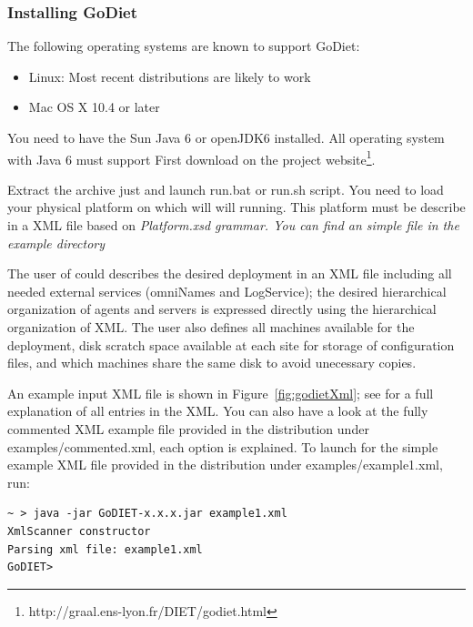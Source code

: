 \subsubsection{Installing GoDiet}

The following operating systems are known to support GoDiet:
\begin{itemize}
    \item Linux: Most recent distributions are likely to work
    \item Mac OS X 10.4 or later
\end{itemize}

You need to have the Sun Java 6 or openJDK6 installed. All operating system with Java 6 must support 
First download \godiet on the project website\footnote{http://graal.ens-lyon.fr/DIET/godiet.html}.

 Extract the archive just and launch run.bat or run.sh script.
You need to load your physical platform on which will \godiet will
running. This platform must be describe in a XML file based on
\it{Platform.xsd} grammar. You can find an simple file in the example directory 



The user of \godiet could describes the desired
deployment in an XML file including all needed external services (\eg omniNames
and LogService); the desired hierarchical organization of agents and servers is
expressed directly using the hierarchical organization of XML. 
The user also defines all machines available for the deployment, disk scratch
space available at each site for storage of configuration files, and which
machines share the same disk to avoid unecessary copies. 


An example input XML file is shown in Figure~\ref{fig:godietXml}; see
\cite{CDa05} for a full explanation of all entries in the XML. You can also
have a look at the fully commented XML example file provided in the \godiet
distribution under examples/commented.xml, each option is explained. To launch
\godiet for the simple example XML file provided in the \godiet distribution
under examples/example1.xml, run:

\begin{verbatim}
~ > java -jar GoDIET-x.x.x.jar example1.xml
XmlScanner constructor
Parsing xml file: example1.xml
GoDIET>
\end{verbatim}

